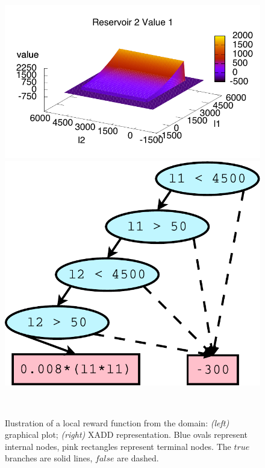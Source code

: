 \begin{figure}[t!]
\hspace{-5mm}
\begin{minipage}{0.25\textwidth}
\center
\includegraphics[width=\textwidth, height=0.75\textwidth]{figures/reservoir2Value1/reservoir2Value1.pdf} 
\end{minipage}
\hspace{-2mm}
\begin{minipage}{0.25\textwidth}
\center
\includegraphics[width=\textwidth, height=0.65\textwidth]{figures/reservoir2Value1/reservoir2Value1DD.pdf}
\end{minipage}\vspace{-3mm}\\
\caption{\footnotesize Ilustration of a local reward function from the \Invent domain: \emph{(left)} graphical plot; \emph{(right)} XADD representation. Blue ovals represent internal nodes, pink rectangles represent terminal nodes. The $true$ branches are solid lines, $false$ are dashed.}
\label{fig:exampleDD}
\vspace{-6mm}
\end{figure}
\vspace{1mm}
